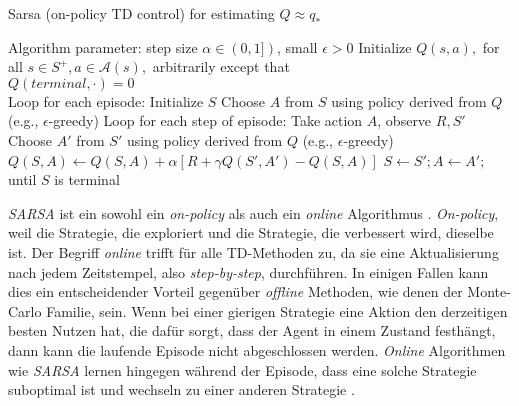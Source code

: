 \begin{algorithm}
    \caption{Sarsa (on-policy TD control) for estimating $Q \approx q_*$}
    \begin{algorithmic}[1]
        \State Algorithm parameter: step size $\alpha \in (0,1])$, small $\epsilon > 0$
        \State Initialize $Q(s,a),$ for all $s \in S^+, a \in \mathcal{A}(s),$ arbitrarily except that \\ $Q(terminal, \mathord{\cdot}) = 0$
        \\
        \State Loop for each episode:
        \Indent
            \State Initialize $S$
            \State Choose $A$ from $S$ using policy derived from $Q$ (e.g., $\epsilon$-greedy)
            \State Loop for each step of episode:
            \Indent
                \State Take action $A$, observe $R, S'$
                \State Choose $A'$ from $S'$ using policy derived from $Q$ (e.g., $\epsilon$-greedy)
                \State $Q(S,A) \gets Q(S,A) + \alpha [R + \gamma Q(S',A') - Q(S,A)]$
                \State $S \gets S'; A \gets A';$
            \EndIndent
            \State until $S$ is terminal
        \EndIndent 
    \end{algorithmic}
\end{algorithm}
\par 
\textit{SARSA} ist ein sowohl ein \textit{on-policy} als auch ein \textit{online} Algorithmus \cite[S.~129f]{Sutton1998}. \textit{On-policy}, weil die Strategie, die exploriert und die Strategie, die verbessert wird, dieselbe ist. Der Begriff \textit{online} trifft für alle TD-Methoden zu, da sie eine Aktualisierung nach jedem Zeitstempel, also \textit{step-by-step}, durchführen. In einigen Fallen kann dies ein entscheidender Vorteil gegenüber \textit{offline} Methoden, wie denen der Monte-Carlo Familie, sein. Wenn bei einer gierigen Strategie eine Aktion den derzeitigen besten Nutzen hat, die dafür sorgt, dass der Agent in einem Zustand festhängt, dann kann die laufende Episode nicht abgeschlossen werden. \textit{Online} Algorithmen wie \textit{SARSA} lernen hingegen während der Episode, dass eine solche Strategie suboptimal ist und wechseln zu einer anderen Strategie \cite[S.~130]{Sutton1998}.
\pagebreak
